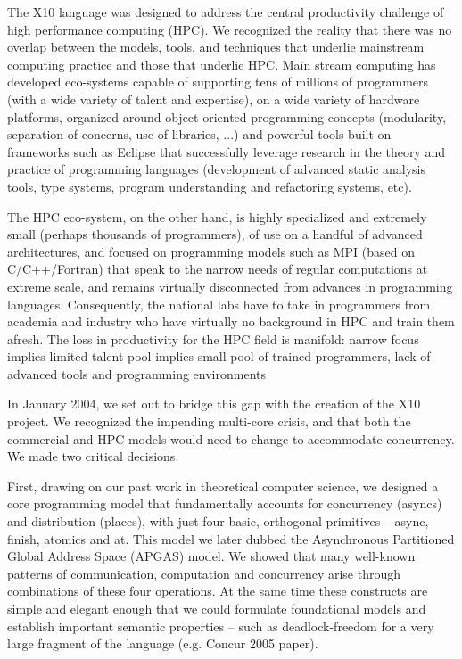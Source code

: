 The X10 language was designed to address the central productivity
challenge of high performance computing (HPC). We recognized the
reality that there was no overlap between the models, tools, and
techniques that underlie mainstream computing practice and those that
underlie HPC. Main stream computing has developed eco-systems capable
of supporting tens of millions of programmers (with a wide variety of
talent and expertise), on a wide variety of hardware platforms,
organized around object-oriented programming concepts (modularity,
separation of concerns, use of libraries, ...) and powerful tools
built on frameworks such as Eclipse that successfully leverage
research in the theory and practice of programming languages
(development of advanced static analysis tools, type systems, program
understanding and refactoring systems, etc). 

The HPC eco-system, on the other hand, is highly specialized and
extremely small (perhaps thousands of programmers), of use on a
handful of advanced architectures, and focused on programming models
such as MPI (based on C/C++/Fortran) that speak to the narrow needs of
regular computations at extreme scale, and remains virtually
disconnected from advances in programming languages. Consequently, the
national labs have to take in programmers from academia and industry
who have virtually no background in HPC and train them afresh. The
loss in productivity for the HPC field is manifold: narrow focus
implies limited talent pool implies  small  pool of trained
programmers, lack of advanced tools and programming environments

In January 2004, we set out to bridge this gap with the creation of
the X10 project. We recognized the impending multi-core crisis, and
that both the commercial and HPC models would need to change to
accommodate concurrency. We made two critical decisions. 

First, drawing on our past work in theoretical computer science, we
designed a core programming model that fundamentally accounts for
concurrency (asyncs) and distribution (places), with just four basic,
orthogonal primitives -- async, finish, atomics and at. This model we
later dubbed the Asynchronous Partitioned Global Address Space (APGAS)
model. We showed that many well-known patterns of communication,
computation and concurrency  arise through combinations of these four
operations. At the same time these constructs are simple and elegant
enough that we could formulate foundational models and establish
important semantic properties -- such as deadlock-freedom for a very
large fragment of the language (e.g. Concur 2005 paper). 

